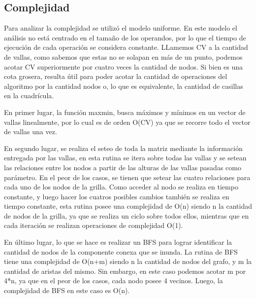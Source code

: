 \documentclass[a4paper, 12pt]{article}
\begin{document}
\subsection*{Complejidad}
Para analizar la complejidad se utilizó el modelo uniforme. En este modelo el análisis no está centrado en el tama\~{n}o de los operandos, por lo que el tiempo de ejecución de cada operación se considera constante.
LLamemos CV a la cantidad de vallas, como sabemos que estas no se solapan en más de un punto, podemos acotar CV superiormente por cuatro veces la cantidad de nodos. Si bien es una cota grosera, resulta útil para poder acotar la cantidad de operaciones del algoritmo por la cantidad nodos o, lo que es equivalente, la cantidad de casillas en la cuadrícula.
 
En primer lugar, la función maxmin, busca máximos y mínimos en un vector de vallas linealmente, por lo cual es de orden O(CV) ya que se recorre todo el vector de vallas una vez.

En segundo lugar, se realiza el seteo de toda la matriz mediante la información entregada por las vallas, en esta rutina se itera sobre todas las vallas y se setean las relaciones entre los nodos a partir de las alturas de las vallas pasadas como parámetro. En el peor de los casos, se tienen que setear las cuatro relaciones para cada uno de los nodos de la grilla. Como acceder al nodo se realiza en tiempo constante, y luego hacer los cuatros posibles cambios también se realiza en tiempo constante, esta rutina posee una complejidad de O(n) siendo n la cantidad de nodos de la grilla, ya que se realiza un ciclo sobre todos ellos, mientras que en cada iteración se realizan operaciones de complejidad O(1).

En último lugar, lo que se hace es realizar un BFS para lograr identificar la cantidad de nodos de la componente conexa que se inunda. La rutina de BFS tiene una complejidad de O(n+m) siendo n la cantidad de nodos del grafo, y m la cantidad de aristas del mismo. Sin embargo, en este caso podemos acotar m por 4*n, ya que en el peor de los casos, cada nodo posee 4 vecinos. Luego, la complejidad de BFS en este caso es O(n).
\end{document}
